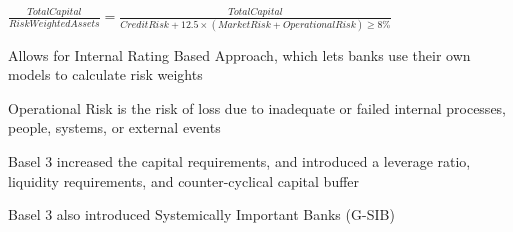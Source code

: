 $\frac{Total Capital}{Risk Weighted Assets} = \frac{Total Capital}{Credit Risk + 12.5 \times (Market Risk + Operational Risk) \geq 8\%}$

Allows for Internal Rating Based Approach, which lets banks use their own models to calculate risk weights

Operational Risk is the risk of loss due to inadequate or failed internal processes, people, systems, or external events

Basel 3 increased the capital requirements, and introduced a leverage ratio, liquidity requirements, and counter-cyclical capital buffer

Basel 3 also introduced Systemically Important Banks (G-SIB)

